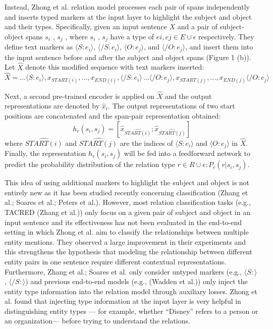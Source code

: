 Instead, Zhong et al. \cite{Zhong2020AFE} relation model processes each pair of spans independently and inserts typed markers at the input layer to highlight the subject and object and their types. Specifically, given an input sentence \(X\) and a pair of subject-object spans \(s_i\) , \(s_j\) , where \(s_i\) , \(s_j\) have a type of \(ei , ej \in E \cup {\epsilon}\) respectively. They define text markers as \(\langle S:e_i\rangle\), \(\langle /S:e_i\rangle\), \(\langle O:e_j\rangle\), and \(\langle /O:e_j\rangle\), and insert them into the input sentence before and after the subject and object spans (Figure 1 (b)). Let \(\widehat{X}\) denote this modified sequence with text markers inserted: \(\widehat{X} = ...\langle S:e_i\rangle,x_{START(i)},...,x_{END(i)},\langle /S:e_i\rangle\,...\langle /O:e_j\rangle,x_{START(j)},...,x_{END(j)}\langle /O:e_j\rangle\)

Next, a second pre-trained encoder is applied on \(\widehat{X}\) and the output representations are denoted by \(\widehat{x}_t\). The output representations of two start positions are concatenated and the span-pair representation obtained: \[h_r(s_i,s_j)=[{\widehat{x}}_{\widehat{START(i)}};{\widehat{x}}_{\widehat{START(j)}}]\]
where \(\widehat{START(i)}\) and \(\widehat{START(j)}\) are the indices of \(\langle S:e_i\rangle\) and \(\langle O:e_j\rangle\) in \(\widehat{X}\). Finally, the representation \(h_r(s_i,s_j)\) will be fed into a feedforward network to predict the probability distribution of the relation type \(r \in R \cup {\epsilon}: P_r(r|s_i , s_j )\).

This idea of using additional markers to highlight the subject and object is not entirely new as it has been studied recently concerning classification (Zhang et al.\cite{zhang-etal-2019-ernie}; Soares et al.\cite{baldini-soares-etal-2019-matching}; Peters et al.\cite{peters2019knowledge}). However, most relation classification tasks (e.g., TACRED (Zhang et al.\cite{zhang-etal-2017-position})) only focus on a given pair of subject and object in an input sentence and its effectiveness has not been evaluated in the end-to-end setting in which Zhong et al. \cite{Zhong2020AFE} aim to classify the relationships between multiple entity mentions. They observed a large improvement in their experiments and this strengthens the hypothesis that modeling the relationship between different entity pairs in one sentence require different contextual representations. Furthermore, Zhang et al.\cite{zhang-etal-2019-ernie}; Soares et al.\cite{baldini-soares-etal-2019-matching} only consider untyped markers (e.g., \(\langle S:\rangle\), \(\langle /S:\rangle\)) and previous end-to-end models (e.g., (Wadden et al.\cite{Wadden2019EntityRA})) only inject the entity type information into the relation model through auxiliary losses. Zhong et al. \cite{Zhong2020AFE} found that injecting type information at the input layer is very helpful in distinguishing entity types — for example, whether “Disney” refers to a person or an organization— before trying to understand the relations.

